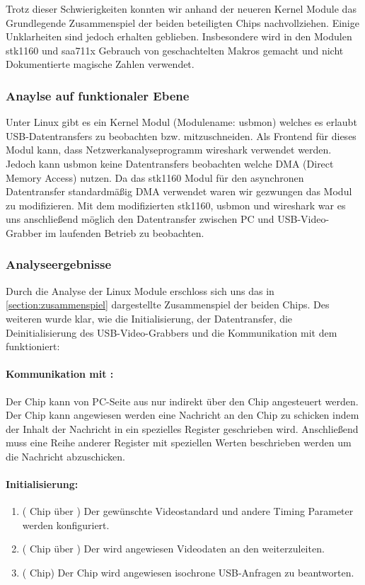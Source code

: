 Trotz dieser Schwierigkeiten konnten wir anhand der neueren Kernel Module das Grundlegende Zusammenspiel der beiden beteiligten Chips nachvollziehen. Einige Unklarheiten sind jedoch erhalten geblieben. Insbesondere wird in den Modulen stk1160 und saa711x Gebrauch von geschachtelten Makros gemacht und nicht Dokumentierte magische Zahlen verwendet. 

\subsubsection{Anaylse auf funktionaler Ebene}
Unter Linux gibt es ein Kernel Modul (Modulename: usbmon) welches es erlaubt USB-Datentransfers zu beobachten bzw. 
mitzuschneiden. Als Frontend für dieses Modul kann, dass Netzwerkanalyseprogramm wireshark verwendet werden. 
Jedoch kann usbmon keine Datentransfers beobachten welche DMA (Direct Memory Access) nutzen. Da das stk1160 Modul für den 
asynchronen Datentransfer standardmäßig DMA verwendet waren wir gezwungen das Modul zu modifizieren.
Mit dem modifizierten stk1160, usbmon und wireshark war es uns anschließend möglich den Datentransfer zwischen PC
und USB-Video-Grabber im laufenden Betrieb zu beobachten.

\subsubsection{Analyseergebnisse}
Durch die Analyse der Linux Module erschloss sich uns das in \autoref{section:zusammenspiel} dargestellte Zusammenspiel der
beiden Chips. Des weiteren wurde klar, wie die Initialisierung, der Datentransfer, die Deinitialisierung des
USB-Video-Grabbers und die Kommunikation mit dem \saa{} funktioniert:

\paragraph{Kommunikation mit \saa{}:} Der \saa{} Chip kann von PC-Seite aus nur indirekt über den \stk{} Chip angesteuert werden.
Der \stk{} Chip kann angewiesen werden eine \iic{} Nachricht an den \saa{} Chip zu schicken indem der Inhalt der Nachricht in ein
spezielles Register geschrieben wird. Anschließend muss eine Reihe anderer Register mit speziellen Werten beschrieben werden um
die Nachricht abzuschicken. 

\paragraph{Initialisierung:}
\begin{enumerate}
 \item (\saa{} Chip über \iic{}) Der gewünschte Videostandard und andere Timing Parameter werden konfiguriert.
 \item (\saa{} Chip über \iic{}) Der \saa{} wird angewiesen Videodaten an den \stk{} weiterzuleiten.
 \item (\stk{} Chip) Der Chip wird angewiesen isochrone USB-Anfragen zu beantworten.
\end{enumerate}

